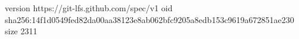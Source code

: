 version https://git-lfs.github.com/spec/v1
oid sha256:14f1d0549fed82da00aa38123e8ab062bfc9205a8edb153c9619a672851ae230
size 2311
